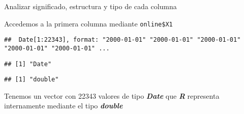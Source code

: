 \documentclass[
  ignorenonframetext,
]{beamer}
\newenvironment{Shaded}{\begin{snugshade}}{\end{snugshade}}
\newcommand{\KeywordTok}[1]{\textcolor[rgb]{0.13,0.29,0.53}{\textbf{#1}}}
\newcommand{\NormalTok}[1]{#1}
\newcommand{\OperatorTok}[1]{\textcolor[rgb]{0.81,0.36,0.00}{\textbf{#1}}}
\begin{document}
\begin{frame}[fragile]{Analizar significado, estructura y tipo de cada
columna}
\protect\hypertarget{analizar-significado-estructura-y-tipo-de-cada-columna}{}

Accedemos a la primera columna mediante \texttt{online\$X1}

\begin{Shaded}
\end{Shaded}

\begin{verbatim}
##  Date[1:22343], format: "2000-01-01" "2000-01-01" "2000-01-01" "2000-01-01" "2000-01-01" ...
\end{verbatim}

\begin{Shaded}
\end{Shaded}

\begin{verbatim}
## [1] "Date"
\end{verbatim}

\begin{Shaded}
\end{Shaded}

\begin{verbatim}
## [1] "double"
\end{verbatim}

Tenemos un vector con 22343 valores de tipo \textbf{\emph{Date}} que
\textbf{\emph{R}} representa internamente mediante el tipo
\textbf{\emph{double}}

\end{frame}
\end{document}
